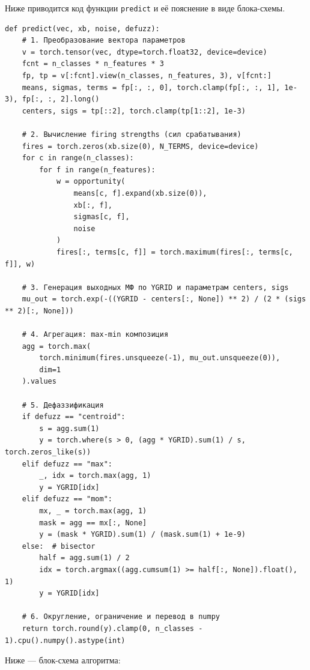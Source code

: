 Ниже приводится код функции \texttt{predict} и её пояснение в виде блока-схемы.

\begin{verbatim}
def predict(vec, xb, noise, defuzz):
    # 1. Преобразование вектора параметров
    v = torch.tensor(vec, dtype=torch.float32, device=device)
    fcnt = n_classes * n_features * 3
    fp, tp = v[:fcnt].view(n_classes, n_features, 3), v[fcnt:]
    means, sigmas, terms = fp[:, :, 0], torch.clamp(fp[:, :, 1], 1e-3), fp[:, :, 2].long()
    centers, sigs = tp[::2], torch.clamp(tp[1::2], 1e-3)

    # 2. Вычисление firing strengths (сил срабатывания)
    fires = torch.zeros(xb.size(0), N_TERMS, device=device)
    for c in range(n_classes):
        for f in range(n_features):
            w = opportunity(
                means[c, f].expand(xb.size(0)),
                xb[:, f],
                sigmas[c, f],
                noise
            )
            fires[:, terms[c, f]] = torch.maximum(fires[:, terms[c, f]], w)

    # 3. Генерация выходных МФ по YGRID и параметрам centers, sigs
    mu_out = torch.exp(-((YGRID - centers[:, None]) ** 2) / (2 * (sigs ** 2)[:, None]))

    # 4. Агрегация: max-min композиция
    agg = torch.max(
        torch.minimum(fires.unsqueeze(-1), mu_out.unsqueeze(0)),
        dim=1
    ).values

    # 5. Дефаззификация
    if defuzz == "centroid":
        s = agg.sum(1)
        y = torch.where(s > 0, (agg * YGRID).sum(1) / s, torch.zeros_like(s))
    elif defuzz == "max":
        _, idx = torch.max(agg, 1)
        y = YGRID[idx]
    elif defuzz == "mom":
        mx, _ = torch.max(agg, 1)
        mask = agg == mx[:, None]
        y = (mask * YGRID).sum(1) / (mask.sum(1) + 1e-9)
    else:  # bisector
        half = agg.sum(1) / 2
        idx = torch.argmax((agg.cumsum(1) >= half[:, None]).float(), 1)
        y = YGRID[idx]

    # 6. Округление, ограничение и перевод в numpy
    return torch.round(y).clamp(0, n_classes - 1).cpu().numpy().astype(int)
\end{verbatim}

\medskip

\noindent Ниже — блок-схема алгоритма:

